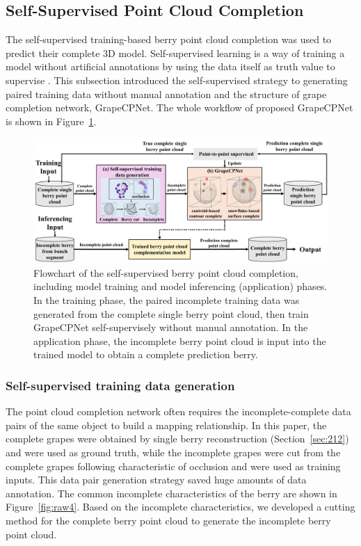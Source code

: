 \documentclass[12pt]{article}
\begin{document}
\subsection{Self-Supervised Point Cloud Completion}

The self-supervised training-based berry point cloud completion was used to predict their complete 3D model. 
Self-supervised learning is a way of training a model without artificial annotations by using the data itself as truth value to supervise \citep{fei_selfsupervised_2023}. 
This subsection introduced the self-supervised strategy to generating paired training data without manual annotation and the structure of grape completion network, GrapeCPNet. 
The whole workflow of proposed GrapeCPNet is shown in Figure~\ref{fig:raw3}.

\begin{figure}[hbt!]
    \centering
    \includegraphics[width=1\textwidth]{figures/Figure7.pdf}
    \caption{Flowchart of the self-supervised berry point cloud completion, including model training and model inferencing (application) phases. In the training phase, the paired incomplete training data was generated from the complete single berry point cloud, then train GrapeCPNet self-supervisely without manual annotation. In the application phase, the incomplete berry point cloud is input into the trained model to obtain a complete prediction berry.}
    \label{fig:raw3}
\end{figure}

\subsubsection{Self-supervised training data generation}

The point cloud completion network often requires the incomplete-complete data pairs of the same object to build a mapping relationship. 
In this paper, the complete grapes were obtained by single berry reconstruction (Section~\ref{sec:212}) and were used as ground truth, while the incomplete grapes were cut from the complete grapes following characteristic of occlusion and were used as training inputs. 
This data pair generation strategy saved huge amounts of data annotation. The common incomplete characteristics of the berry are shown in Figure~\ref{fig:raw4}.
Based on the incomplete characteristics, we developed a cutting method for the complete berry point cloud to generate the incomplete berry point cloud.
\end{document}
